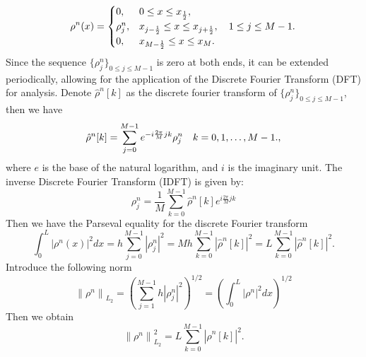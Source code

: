 \documentclass[10pt, reqno]{amsart}
\theoremstyle{remark}
\theoremstyle{definition}
\numberwithin{table}{section}
\begin{document}
\begin{align}
\rho^n(x)= \begin{cases}0,  & 0 \leq x \leq x_{\frac{1}{2}},  \\ \rho_j^n,  & x_{j-\frac{1}{2}} \leq x \leq x_{j+\frac{1}{2}},  \quad 1 \leq j \leq M-1.  \\ 0,  & x_{M-\frac{1}{2}} \leq x \leq x_M . \end{cases}\notag
\end{align}
Since the sequence $\{\rho^n_j\}_{0\leq j\leq M-1}$ is zero at both ends,  it can be extended periodically,  allowing for the application of the Discrete Fourier Transform (DFT) for analysis. 
Denote $\hat{\rho}^n[k]$ as the discrete fourier transform of $\{\rho^n_j\}_{0\leq j\leq M-1}$, then we have
\begin{equation}
\hat{\rho}^n[k]=\sum_{j=0}^{M-1} e^{-i \frac{2 \pi}{M} j k} \rho^n_j \quad k=0, 1,  \ldots,  M-1 . , \notag
\end{equation}
where \( e \) is the base of the natural logarithm,  and \( i \) is the imaginary unit.  The inverse Discrete Fourier Transform (IDFT) is given by:
\[
\rho^n_j = \frac{1}{M} \sum_{k=0}^{M-1} \hat{\rho}^n[k] e^{i \frac{2\pi}{M} jk}
\]
Then we have the Parseval equality for the discrete Fourier transform
$$
\int_0^L\left|\rho^n(x)\right|^2 d x=h\sum_{j=0}^{M-1}\left|\rho^n_j\right|^2=Mh\sum_{k=0}^{M-1}\left|\hat{\rho}^n[k]\right|^2 =L\sum_{k=0}^{M-1}\left|\hat{\rho}^n[k]\right|^2. 
$$
Introduce the following norm
$$
\left\|\rho^n\right\|_{L_2}=\left(\sum_{j=1}^{M-1} h\left|\rho_j^n\right|^2\right)^{1 / 2}=\left(\int_0^L\left|\rho^n\right|^2 d x\right)^{1 / 2}
$$
Then we obtain
$$
\left\|\rho^n\right\|_{L_2}^2=L\sum_{k=0}^{M-1}\left|\hat{\rho}^n[k]\right|^2. 
$$
\end{document}
